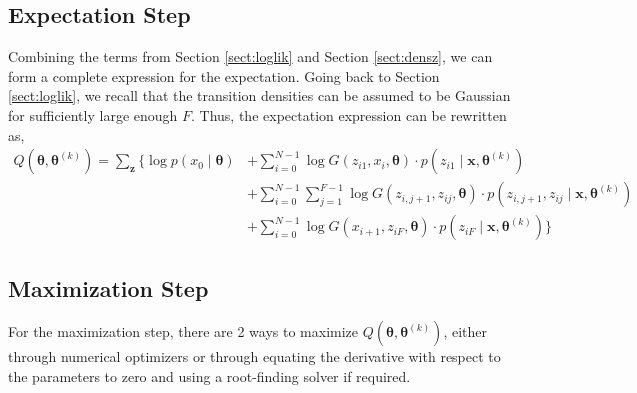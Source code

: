 \documentclass[12pt]{article}
\newcommand{\bx}{\ensuremath{\mathbf{x}}}
\newcommand{\bz}{\ensuremath{\mathbf{z}}}
\newcommand{\btheta}{\ensuremath{\boldsymbol{\theta}}}
\begin{document}
\subsection{Expectation Step}
Combining the terms from Section \ref{sect:loglik} and Section \ref{sect:densz}, we can form a complete expression for the expectation. Going back to Section \ref{sect:loglik}, we recall that the transition densities can be assumed to be Gaussian for sufficiently large enough $F$. Thus, the expectation expression can be rewritten as,
\begin{align}
Q(\btheta, \btheta^{(k)}) = \sum_{\bz} \Big \{ \log p(x_0 \mid \btheta) & + \sum_{i=0}^{N-1} \log G(z_{i1}, x_i, \btheta) \cdot p(z_{i1} \mid \bx, \btheta^{(k)}) \nonumber \\
& + \sum_{i=0}^{N-1} \sum_{j=1}^{F-1} \log G(z_{i,j+1}, z_{ij}, \btheta) \cdot p(z_{i,j+1}, z_{ij} \mid \bx, \btheta^{(k)}) \nonumber \\
& + \sum_{i=0}^{N-1} \log G(x_{i+1}, z_{iF}, \btheta) \cdot p(z_{iF} \mid \bx, \btheta^{(k)}) \Big \}
\end{align}

\subsection{Maximization Step}
For the maximization step, there are 2 ways to maximize $Q(\btheta, \btheta^{(k)})$, either through numerical optimizers or through equating the derivative with respect to the parameters to zero and using a root-finding solver if required.
\end{document}

